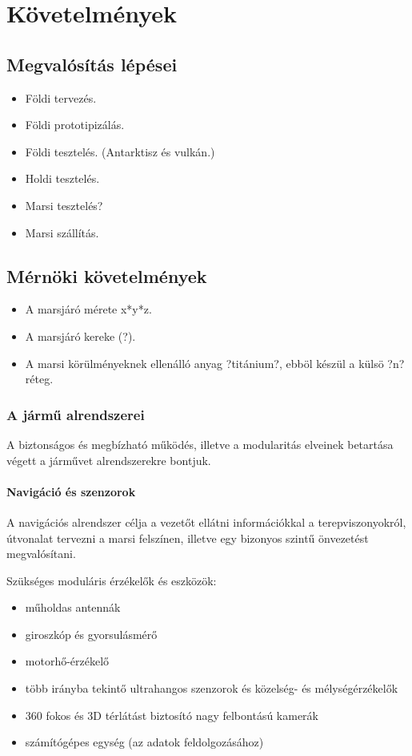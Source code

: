 \documentclass[12pt]{report}
\begin{document}
\chapter{Követelmények}
\section{Megvalósítás lépései}
\begin{itemize}
  \item Földi tervezés.
  \item Földi prototipizálás.
  \item Földi tesztelés. (Antarktisz és vulkán.)
  \item Holdi tesztelés.
  \item Marsi tesztelés?
  \item Marsi szállítás.
\end{itemize}
\section{Mérnöki követelmények}
\begin{itemize}
  \item A marsjáró mérete x*y*z.
  \item A marsjáró kereke (?).
  \item A marsi körülményeknek ellenálló anyag ?titánium?, ebböl készül a külsö ?n? réteg.
\end{itemize}

\subsection{A jármű alrendszerei\label{subsytems}}

A biztonságos és megbízható működés, illetve a modularitás elveinek betartása végett a 
járművet alrendszerekre bontjuk.

\subsubsection{Navigáció és szenzorok}
A navigációs alrendszer célja a vezetőt ellátni információkkal a terepviszonyokról, útvonalat tervezni a marsi felszínen, illetve egy bizonyos szintű önvezetést megvalósítani.

Szükséges moduláris érzékelők és eszközök:
\begin{itemize}
  \item műholdas antennák
  \item giroszkóp és gyorsulásmérő
  \item motorhő-érzékelő
  \item több irányba tekintő ultrahangos szenzorok és közelség- és mélységérzékelők
  \item 360 fokos és 3D térlátást biztosító nagy felbontású kamerák 
  \item számítógépes egység (az adatok feldolgozásához)
\end{itemize}
\end{document}
